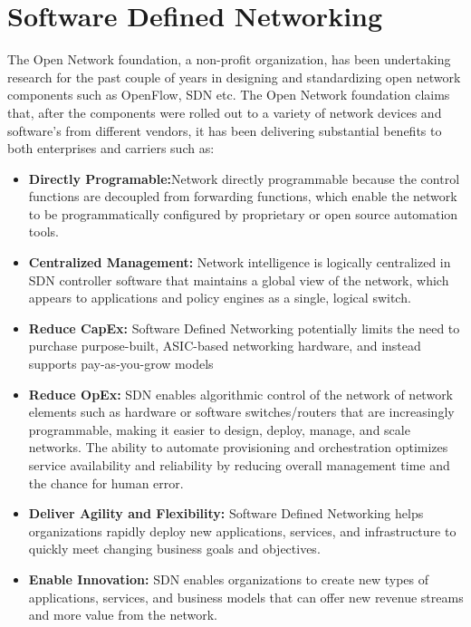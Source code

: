 
\chapter{Software Defined Networking}\label{ch:software_defined_networking}
\sffamily{}
The Open Network foundation, a non-profit organization, has been undertaking research for the past couple of years in designing and standardizing open network components such as OpenFlow, SDN etc. The Open Network foundation claims that, after the components were rolled out to a variety of network devices and software’s from different vendors, it has been delivering substantial benefits to both enterprises and carriers such as: \cite{What_is_SDN}

\begin{itemize}
	\item \textbf{Directly Programable:}Network directly programmable because the control functions are decoupled from forwarding functions, which enable the network to be programmatically configured by proprietary or open source automation tools.
	\item \textbf{Centralized Management:} Network intelligence is logically centralized in SDN controller software that maintains a global view of the network, which appears to applications and policy engines as a single, logical switch.
	\item \textbf{Reduce \gls{CapEx}:} Software Defined Networking potentially limits the need to purchase purpose-built, ASIC-based networking hardware, and instead supports pay-as-you-grow models
	\item \textbf{Reduce \gls{OpEx}:} SDN enables algorithmic control of the network of network elements such as hardware or software switches/routers that are increasingly programmable, making it easier to design, deploy, manage, and scale networks. The ability to automate provisioning and orchestration optimizes service availability and reliability by reducing overall management time and the chance for human error.
	\item \textbf{Deliver Agility and Flexibility:} Software Defined Networking helps organizations rapidly deploy new applications, services, and infrastructure to quickly meet changing business goals and objectives.
	\item \textbf{Enable Innovation:} SDN enables organizations to create new types of applications, services, and business models that can offer new revenue streams and more value from the network.
	
\end{itemize}
